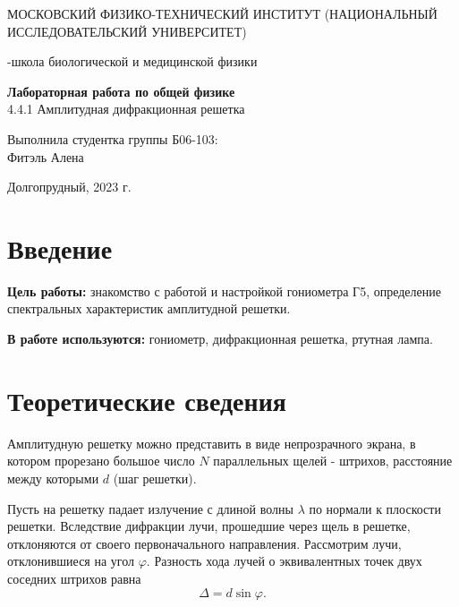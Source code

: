 \documentclass{article}
\begin{document}
\def\figurename{Рисунок}
\begin{titlepage}
\begin{center}
    {\large МОСКОВСКИЙ ФИЗИКО-ТЕХНИЧЕСКИЙ ИНСТИТУТ (НАЦИОНАЛЬНЫЙ ИССЛЕДОВАТЕЛЬСКИЙ УНИВЕРСИТЕТ)}
\end{center}
\begin{center}
    {-школа биологической и медицинской физики}
\end{center}

\vspace{1cm}
{\huge
\begin{center}
    {\bf Лабораторная работа по общей физике}\\
    \vspace{0.5cm}
    4.4.1 Амплитудная дифракционная решетка
\end{center}
}

\vspace{4cm}
\begin{flushright}
{\LARGE Выполнила студентка группы Б06-103:\\ Фитэль Алена \\}

\end{flushright}
\vspace{9cm}
\begin{center}
    Долгопрудный, 2023 г.
\end{center}
\end{titlepage}
\newpage
\section{Введение}

\textbf{Цель работы:} знакомство с работой и настройкой гониометра Г5, определение спектральных характеристик амплитудной решетки.

\textbf{В работе используются:} гониометр, дифракционная решетка, ртутная лампа.

\section{Теоретические сведения}

Амплитудную решетку можно представить в виде непрозрачного экрана, в котором прорезано большое число $N$ параллельных щелей - штрихов, расстояние между которыми $d$ (шаг решетки).


Пусть на решетку падает излучение с длиной волны $\lambda$ по нормали к плоскости решетки. Вследствие дифракции лучи, прошедшие через щель в решетке, отклоняются от своего первоначального направления. Рассмотрим лучи, отклонившиеся на угол $\varphi$. Разность хода лучей о эквивалентных точек двух соседних штрихов равна 
\[ \Delta = d \sin \varphi .\]
\end{document}
